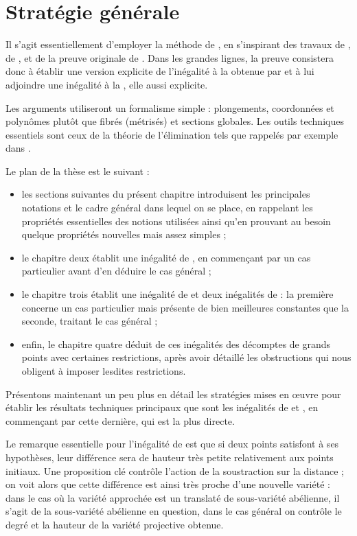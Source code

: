 
\section{Stratégie générale}

Il s'agit essentiellement d'employer la méthode de , en s'inspirant
des travaux de  \cite{remivds,remivg,remdcl}, de 
\cite[chap.~2]{farhith}, et de la preuve originale de 
\cite{faldaav}.  Dans les grandes lignes, la preuve consistera donc à établir
une version explicite de l'inégalité à la  obtenue par
 et à lui adjoindre une inégalité à la , elle aussi
explicite.

Les arguments utiliseront un formalisme simple : plongements, coordonnées et
polynômes plutôt que fibrés (métrisés) et sections globales. Les outils
techniques essentiels sont ceux de la théorie de l'élimination tels que
rappelés par exemple dans \cite[chap.~5 à~7]{nesphilnm}.

Le plan de la thèse est le suivant :
\begin{itemize}
  \item les sections suivantes du présent chapitre introduisent les
    principales notations et le cadre général dans lequel on se place, en
    rappelant les propriétés essentielles des notions utilisées ainsi qu'en
    prouvant au besoin quelque propriétés nouvelles mais assez simples ;
  \item le chapitre deux établit une inégalité de , en commençant
    par un cas particulier avant d'en déduire le cas général ;
  \item le chapitre trois établit une inégalité de  et deux
    inégalités de  : la première concerne un cas particulier mais
    présente de bien meilleures constantes que la seconde, traitant le cas
    général ;
  \item enfin, le chapitre quatre déduit de ces inégalités des décomptes de
    grands points avec certaines restrictions, après avoir détaillé les
    obstructions qui nous obligent à imposer lesdites restrictions.
\end{itemize}
Présentons maintenant un peu plus en détail les stratégies mises en œuvre pour
établir les résultats techniques principaux que sont les inégalités de
 et , en commençant par cette dernière, qui est la
plus directe.

\medskip

Le remarque essentielle pour l'inégalité de  est que si deux
points satisfont à ses hypothèses, leur différence sera de hauteur très petite
relativement aux points initiaux. Une proposition clé contrôle l'action de la
soustraction sur la distance ; on voit alors que cette différence est ainsi
très proche d'une nouvelle variété : dans le cas où la variété approchée est
un translaté de sous-variété abélienne, il s'agit de la sous-variété abélienne
en question, dans le cas général on contrôle le degré et la hauteur de la
variété projective obtenue.

